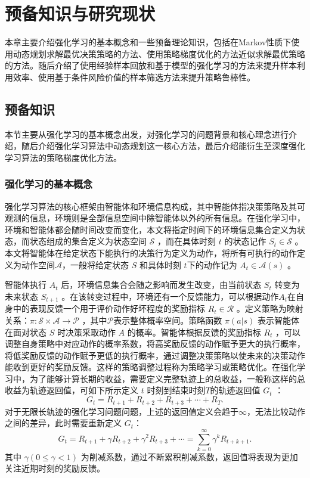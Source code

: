 
\chapter{预备知识与研究现状}\label{chap:background}

本章主要介绍强化学习的基本概念和一些预备理论知识，包括在Markov性质下使用动态规划求解最优决策策略的方法、使用策略梯度优化的方法近似求解最优策略的方法。随后介绍了使用经验样本回放和基于模型的强化学习的方法来提升样本利用效率、使用基于条件风险价值的样本筛选方法来提升策略鲁棒性。

\section{预备知识}

本节主要从强化学习的基本概念出发，对强化学习的问题背景和核心理念进行介绍，随后介绍强化学习算法中动态规划这一核心方法，最后介绍能衍生至深度强化学习算法的策略梯度优化方法。

\subsection{强化学习的基本概念}

强化学习算法的核心框架由智能体和环境信息构成，其中智能体指决策策略及其可观测的信息，环境则是全部信息空间中除智能体以外的所有信息。在强化学习中，环境和智能体都会随时间改变而变化，本文将指定时间下的环境信息集合定义为状态，而状态组成的集合定义为状态空间 $\mathcal S$ ，而在具体时刻 $t$ 的状态记作 $S_t\in \mathcal S$ 。本文将智能体在给定状态下能执行的决策行为定义为动作，将所有可执行的动作定义为动作空间$\mathcal{A}$，一般将给定状态 $S$ 和具体时刻 $t$下的动作记为 $A_t\in\mathcal{A}(s)$ 。

智能体执行 $A_t$ 后，环境信息集合会随之影响而发生改变，由当前状态 $S_t$ 转变为未来状态 $S_{t+1}$ 。在该转变过程中，环境还有一个反馈能力，可以根据动作$A_t$在自身中的表现反馈一个用于评价动作好坏程度的奖励指标 $R_{t}\in\mathcal{R}$ 。定义策略为映射关系：$\pi:\mathcal{S}\times\mathcal{A}\to \mathcal{P}$ ，其中$\mathcal P$表示整体概率空间。策略函数 $\pi(a|s)$ 表示智能体在面对状态 $S$ 时决策采取动作 $A$ 的概率。智能体根据反馈的奖励指标 $R_{t}$ ，可以调整自身策略中对应动作的概率系数，将高奖励反馈的动作赋予更大的执行概率，将低奖励反馈的动作赋予更低的执行概率，通过调整决策策略以使未来的决策动作能收到更好的奖励反馈。这样的策略调整过程称为策略学习或策略优化。在强化学习中，为了能够计算长期的收益，需要定义完整轨迹上的总收益，一般称这样的总收益为轨迹返回值，可如下所示定义 $t$ 时刻到结束时刻$T$的轨迹返回值 $G_t$ ：
\begin{equation}
G_t = R_{t+1}+R_{t+2}+R_{t+3}+\cdots+R_T.
\end{equation}
对于无限长轨迹的强化学习问题问题，上述的返回值定义会趋于$\infty$，无法比较动作之间的差异，此时需要重新定义 $G_t$：
\begin{equation}
G_t = R_{t+1}+\gamma R_{t+2}+\gamma^2 R_{t+3}+\cdots = \sum_{k=0}^{\infty}\gamma^kR_{t+k+1}.
\end{equation}
其中 $\gamma(0\leq \gamma < 1)$ 为削减系数，通过不断累积削减系数，返回值将表现为更加关注近期时刻的奖励反馈。

